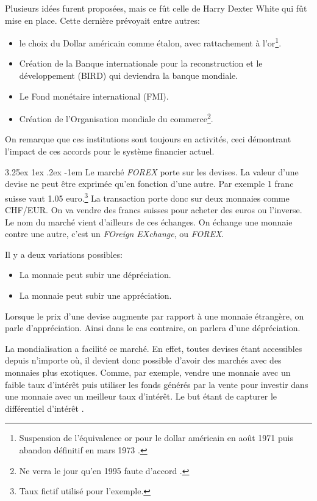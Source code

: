 \documentclass[a4paper, 11pt]{article}
\makeatletter
\renewcommand\paragraph{\@startsection{paragraph}{5}{\z@}%
  {3.25ex \@plus1ex \@minus.2ex}%
  {-1em}%
  {\normalfont\normalsize\bfseries}}
\makeatother
\begin{document}
Plusieurs idées furent proposées, mais ce fût celle de Harry Dexter White qui fût mise en place. Cette dernière prévoyait entre autres:
\begin{itemize}
\item le choix du Dollar américain comme étalon, avec rattachement à l'or\footnote{Suspension de l'équivalence or pour le dollar américain en août 1971 puis abandon 
définitif en mars 1973 \cite{wikipedia_bretten_woods}.}.
\item Création de la Banque internationale pour la reconstruction et le développement (BIRD) qui deviendra la banque mondiale.
\item Le Fond monétaire international (FMI).
\item Création de l'Organisation mondiale du commerce\footnote{Ne verra le jour qu'en 1995 faute d'accord \cite{wikipedia_bretten_woods}.}.
\end{itemize}

On remarque que ces institutions sont toujours en activités, 
ceci démontrant l'impact de ces accords pour le système financier actuel.

\paragraph{}
Le marché \textit{FOREX} porte sur les devises. La valeur d'une devise ne peut être exprimée qu'en fonction d'une autre. 
Par exemple 1 franc suisse vaut 1.05 euro.\footnote{Taux fictif utilisé pour l'exemple.}
La transaction porte donc sur deux monnaies comme CHF/EUR. On va vendre des francs suisses pour acheter des euros ou l'inverse.
Le nom du marché vient d'ailleurs de ces échanges. 
On échange une monnaie contre une autre, c'est un \textit{FOreign EXchange}, ou \textit{FOREX}.

Il y a deux variations possibles:
\begin{itemize}
\item La monnaie peut subir une dépréciation.
\item La monnaie peut subir une appréciation.
\end{itemize}
Lorsque le prix d'une devise augmente par rapport à une monnaie étrangère, on parle d'appréciation. 
Ainsi dans le cas contraire, on parlera d'une dépréciation.

La mondialisation a facilité ce marché. En effet, toutes devises étant accessibles depuis 
n'importe où, il devient donc possible d'avoir des marchés avec des monnaies plus exotiques.
Comme, par exemple, vendre une monnaie avec un faible taux d'intérêt puis utiliser les fonds générés par la vente pour investir dans une monnaie avec un meilleur taux d'intérêt. Le but étant de capturer le différentiel d'intérêt \cite{currency_carry_trade}.
\end{document}
